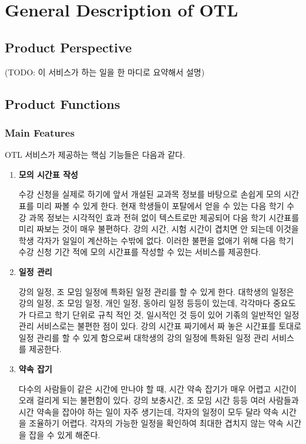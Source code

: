 \documentclass[a4paper,titlepage]{article}
\begin{document}
\pagebreak
\section{General Description of OTL}
\subsection{Product Perspective}

(TODO: 이 서비스가 하는 일을 한 마디로 요약해서 설명)

\subsection{Product Functions}
\subsubsection{Main Features}
OTL 서비스가 제공하는 핵심 기능들은 다음과 같다.
\begin{enumerate}
	\item\textbf{모의 시간표 작성}

	수강 신청을 실제로 하기에 앞서 개설된 교과목 정보를 바탕으로 손쉽게 모의 시간표를 미리 짜볼 수 있게 한다.
	현재 학생들이 포탈에서 얻을 수 있는 다음 학기 수강 과목 정보는 시각적인 효과 전혀 없이 텍스트로만 제공되어 다음 학기 시간표를 미리 짜보는 것이 매우 불편하다.
	강의 시간, 시험 시간이 겹치면 안 되는데 이것을 학생 각자가 일일이 계산하는 수밖에 없다.
	이러한 불편을 없애기 위해 다음 학기 수강 신청 기간 적에 모의 시간표를 작성할 수 있는 서비스를 제공한다.

	\item\textbf{일정 관리}

	강의 일정, 조 모임 일정에 특화된 일정 관리를 할 수 있게 한다.
	대학생의 일정은 강의 일정, 조 모임 일정, 개인 일정, 동아리 일정 등등이 있는데, 각각마다 중요도가 다르고 학기 단위로 규칙 적인 것, 일시적인 것 등이 있어 기졲의 일반적인 일정 관리 서비스로는 불편한 점이 있다.
	강의 시간표 짜기에서 짜 놓은 시간표를 토대로 일정 관리를 할 수 있게 함으로써 대학생의 강의 일정에 특화된 일정 관리 서비스를 제공한다. 

	\item\textbf{약속 잡기}

	다수의 사람들이 같은 시간에 만나야 할 때, 시간 약속 잡기가 매우 어렵고 시간이 오래 걸리게 되는 불편함이 있다.
	강의 보충시간, 조 모임 시간 등등 여러 사람들과 시간 약속을 잡아야 하는 일이 자주 생기는데, 각자의 일정이 모두 달라 약속 시간을 조율하기 어렵다.
	각자의 가능한 일정을 확인하여 최대한 겹치지 않는 약속 시간을 잡을 수 있게 해준다.

\end{enumerate}
\end{document}
